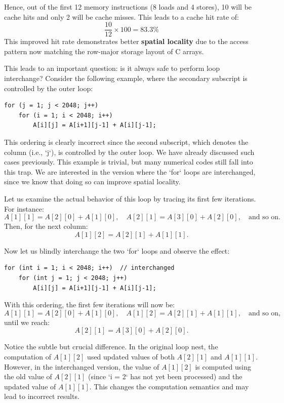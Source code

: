 \documentclass[12pt]{book}
\begin{document}
Hence, out of the first 12 memory instructions (8 loads and 4 stores), 10 will be cache hits and only 2 will be cache misses. This leads to a cache hit rate of:
\[
\frac{10}{12} \times 100 = 83.3\%
\]
This improved hit rate demonstrates better \textbf{spatial locality} due to the access pattern now matching the row-major storage layout of C arrays.

This leads to an important question: is it always safe to perform loop interchange? Consider the following example, where the secondary subscript is controlled by the outer loop:

\begin{lstlisting}[style=cppstyle]
for (j = 1; j < 2048; j++)
    for (i = 1; i < 2048; i++)
        A[i][j] = A[i+1][j-1] + A[i][j-1];
\end{lstlisting}

This ordering is clearly incorrect since the second subscript, which denotes the column (i.e., `j`), is controlled by the outer loop. We have already discussed such cases previously. This example is trivial, but many numerical codes still fall into this trap. We are interested in the version where the `for` loops are interchanged, since we know that doing so can improve spatial locality.

Let us examine the actual behavior of this loop by tracing its first few iterations. For instance:
\[
A[1][1] = A[2][0] + A[1][0], \quad A[2][1] = A[3][0] + A[2][0], \quad \text{and so on}.
\]
Then, for the next column:
\[
A[1][2] = A[2][1] + A[1][1].
\]

Now let us blindly interchange the two `for` loops and observe the effect:

\begin{lstlisting}[style=cppstyle]
for (int i = 1; i < 2048; i++)  // interchanged
    for (int j = 1; j < 2048; j++)
        A[i][j] = A[i+1][j-1] + A[i][j-1];
\end{lstlisting}


With this ordering, the first few iterations will now be:
\[
A[1][1] = A[2][0] + A[1][0], \quad A[1][2] = A[2][1] + A[1][1], \quad \text{and so on,}
\]
until we reach:
\[
A[2][1] = A[3][0] + A[2][0].
\]

Notice the subtle but crucial difference. In the original loop nest, the computation of $A[1][2]$ used updated values of both $A[2][1]$ and $A[1][1]$. However, in the interchanged version, the value of $A[1][2]$ is computed using the old value of $A[2][1]$ (since `i = 2` has not yet been processed) and the updated value of $A[1][1]$. This changes the computation semantics and may lead to incorrect results.
\end{document}
